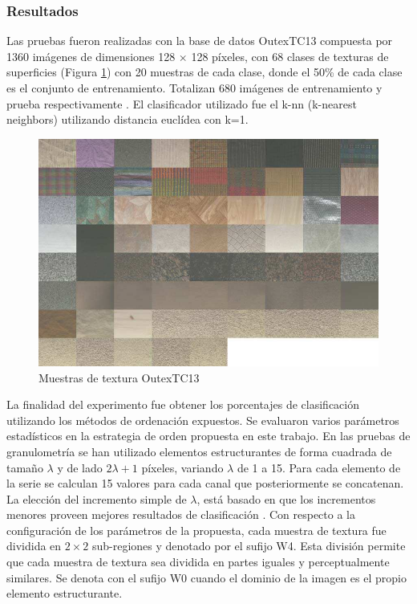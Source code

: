 \subsubsection{Resultados}
\label{sec:resultadosexperi}
Las pruebas fueron realizadas con la base de datos OutexTC13 compuesta por 1360 imágenes de dimensiones 128 $\times $ 128 píxeles, con 68 clases de texturas de superficies (Figura \ref{fig:outex13}) con 20 muestras de cada clase, donde el 50\% de cada clase es el conjunto de entrenamiento. Totalizan 680 imágenes de entrenamiento y prueba respectivamente \cite{ojala2002outex}.  
El clasificador utilizado fue el k-nn (k-nearest neighbors) utilizando distancia euclídea con k=1. 

\begin{figure}
	\centering
		\includegraphics[scale=0.25]{fig/outex13.png}
	\caption{Muestras de textura OutexTC13}
	\label{fig:outex13}
\end{figure}

La finalidad del experimento fue obtener los porcentajes de clasificación utilizando los métodos de ordenación expuestos.
Se evaluaron varios parámetros estadísticos en la estrategia de orden propuesta en este trabajo.
En las pruebas de granulometría se han utilizado elementos estructurantes de forma cuadrada de tamaño $\lambda$ y de lado $2\lambda+1$ píxeles, variando $\lambda$  de 1 a 15. Para cada elemento de la serie se calculan 15 valores para cada canal que posteriormente se concatenan. La elección del incremento simple de $\lambda$, está basado en que los incrementos menores proveen mejores resultados de clasificación \cite{de2006selecting}. 
Con respecto a la configuración de los parámetros de la propuesta, cada muestra de textura fue dividida en $2\times2$ sub-regiones y denotado por el sufijo W4. Esta división permite que cada muestra de textura sea dividida en partes iguales y perceptualmente similares. Se denota con el sufijo W0 cuando el dominio de la imagen es el propio elemento estructurante. 

